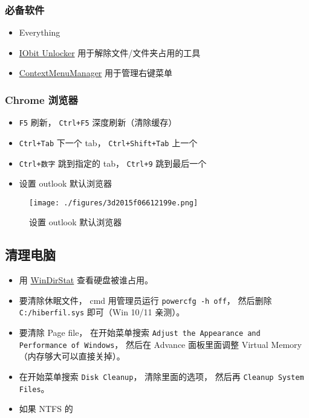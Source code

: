 \subsubsection{必备软件}
\begin{itemize}
\item Everything
\item \href{https://www.iobit.com/en/iobit-unlocker.php}{IObit Unlocker} 用于解除文件/文件夹占用的工具
\item \href{https://github.com/BluePointLilac/ContextMenuManager}{ContextMenuManager} 用于管理右键菜单
\end{itemize}

\subsubsection{Chrome 浏览器}
\begin{itemize}
\item \verb`F5` 刷新， \verb`Ctrl+F5` 深度刷新（清除缓存）
\item \verb`Ctrl+Tab` 下一个 tab， \verb`Ctrl+Shift+Tab` 上一个
\item \verb`Ctrl+数字` 跳到指定的 tab， \verb`Ctrl+9` 跳到最后一个
\item 设置 outlook 默认浏览器
\end{itemize}
\begin{figure}[ht]
\centering
\texttt{[image: ./figures/3d2015f06612199e.png]}
\caption{设置 outlook 默认浏览器} \label{fig_WinNt_2}
\end{figure}


\subsection{清理电脑}
\begin{itemize}
\item 用 \href{https://windirstat.net/}{WinDirStat} 查看硬盘被谁占用。
\item 要清除休眠文件， cmd 用管理员运行 \verb`powercfg -h off`， 然后删除 \verb`C:/hiberfil.sys` 即可（Win 10/11 亲测）。
\item 要清除 Page file， 在开始菜单搜索 \verb`Adjust the Appearance and Performance of Windows`， 然后在 Advance 面板里面调整 Virtual Memory（内存够大可以直接关掉）。
\item 在开始菜单搜索 \verb`Disk Cleanup`， 清除里面的选项， 然后再 \verb`Cleanup System Files`。
\item 如果 NTFS 的
\end{itemize}

